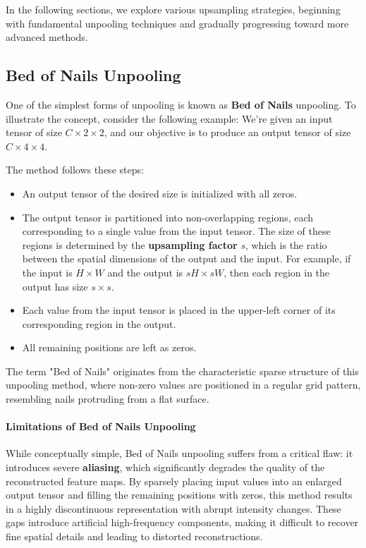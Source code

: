 \noindent In the following sections, we explore various upsampling strategies, beginning with fundamental unpooling techniques and gradually progressing toward more advanced methods.

\subsection{Bed of Nails Unpooling} 

\noindent One of the simplest forms of unpooling is known as \textbf{Bed of Nails} unpooling. To illustrate the concept, consider the following example: We're given an input tensor of size $C \times 2 \times 2$, and our objective is to produce an output tensor of size $C \times 4 \times 4$.

\noindent The method follows these steps:

\begin{itemize}
	\item An output tensor of the desired size is initialized with all zeros.
	\item The output tensor is partitioned into non-overlapping regions, each corresponding to a single value from the input tensor. The size of these regions is determined by the \textbf{upsampling factor} $s$, which is the ratio between the spatial dimensions of the output and the input. For example, if the input is $H \times W$ and the output is $sH \times sW$, then each region in the output has size $s \times s$. 
	\item Each value from the input tensor is placed in the upper-left corner of its corresponding region in the output.
	\item All remaining positions are left as zeros.
\end{itemize}

\noindent The term "Bed of Nails" originates from the characteristic sparse structure of this unpooling method, where non-zero values are positioned in a regular grid pattern, resembling nails protruding from a flat surface.

\paragraph{Limitations of Bed of Nails Unpooling}

\noindent While conceptually simple, Bed of Nails unpooling suffers from a critical flaw: it introduces severe \textbf{aliasing}, which significantly degrades the quality of the reconstructed feature maps. By sparsely placing input values into an enlarged output tensor and filling the remaining positions with zeros, this method results in a highly discontinuous representation with abrupt intensity changes. These gaps introduce artificial high-frequency components, making it difficult to recover fine spatial details and leading to distorted reconstructions.

